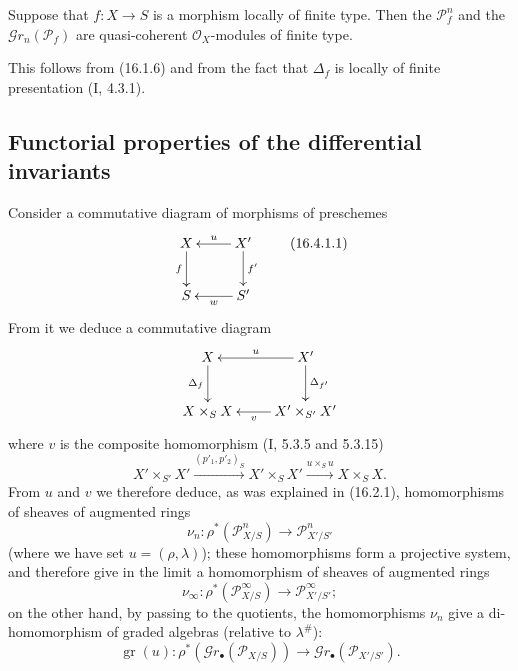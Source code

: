 \begin{proposition}[16.3.9]
\label{IV.16.3.9}
Suppose that $f:X\to S$ is a morphism locally of finite type. Then the
$\mathscr{P}_f^n$ and the $\mathscr{G}r_n(\mathscr{P}_f)$ are quasi-coherent
$\mathcal{O}_X$-modules of finite type.
\end{proposition}

This follows from (16.1.6) and from the fact that $\Delta_f$ is locally of finite
presentation (I, 4.3.1).


\subsection{Functorial properties of the differential invariants}

\begin{env}[16.4.1]
\label{IV.16.4.1}
Consider a commutative diagram of morphisms of preschemes
\[
  \xymatrix{
    X \ar[d]_-{f} & X' \ar[l]_-u \ar[d]^-{f'} \\
    S & S' \ar[l]^-w
  }
  \tag{16.4.1.1}
  \label{IV.16.4.1.1}
\]
From it we deduce a commutative diagram
\[
  \xymatrix{
    X \ar[d]_-{\Delta_f} & X' \ar[l]_-u \ar[d]^-{\Delta_{f'}} \\
    X\times_S X & X'\times_{S'}X' \ar[l]^-v
  }
\]
where $v$ is the composite homomorphism (I, 5.3.5 and 5.3.15)
\[
  X'\times_{S'}X'
  \xrightarrow{(p'_1,p'_2)_S}X'\times_S X'
  \xrightarrow{u\times_S u}X\times_S X.
  \tag{16.4.1.2}
  \label{IV.16.4.1.2}
\]
From $u$ and $v$ we therefore deduce, as was explained in (16.2.1),
homomorphisms of sheaves of augmented rings
\[
  \nu_n:\rho^*(\mathscr{P}_{X/S}^n)\longrightarrow
  \mathscr{P}_{X'/S'}^n
  \tag{16.4.1.3}
  \label{IV.16.4.1.3}
\]
(where we have set $u=(\rho,\lambda)$); these homomorphisms form a projective
system, and therefore give in the limit a homomorphism of sheaves of augmented
rings
\[
  \nu_\infty:\rho^*(\mathscr{P}_{X/S}^\infty)\longrightarrow
  \mathscr{P}_{X'/S'}^\infty;
  \tag{16.4.1.4}
  \label{IV.16.4.1.4}
\]
on the other hand, by passing to the quotients, the homomorphisms $\nu_n$ give a
di-homomorphism of graded algebras (relative to $\lambda^\#$):
\[
  \operatorname{gr}(u):\rho^*(\mathscr{G}r_\bullet(\mathscr{P}_{X/S}))
  \longrightarrow\mathscr{G}r_\bullet(\mathscr{P}_{X'/S'}).
  \tag{16.4.1.5}
  \label{IV.16.4.1.5}
\]
\end{env}


